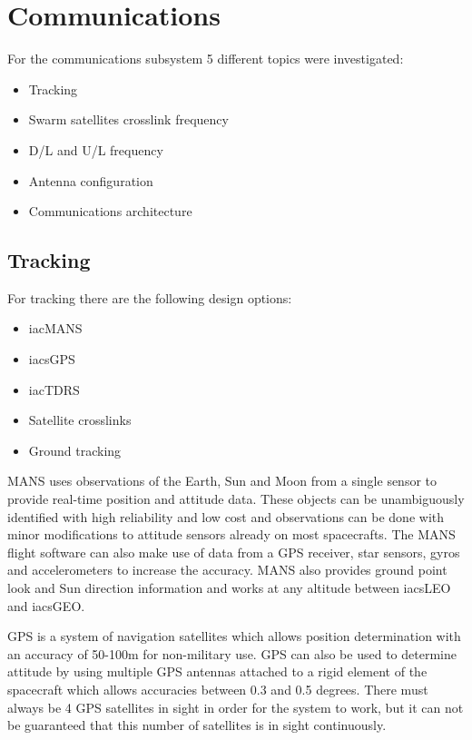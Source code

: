 \section{Communications}
\label{blDOCOM}

For the communications subsystem 5 different topics were investigated:
\begin{itemize}
\item Tracking
\item Swarm satellites crosslink frequency
\item D/L and U/L frequency
\item Antenna configuration
\item Communications architecture
\end{itemize}

\subsection{Tracking}
For tracking there are the following design options:
\begin {itemize}
\item iac{MANS}
\item iacs{GPS}
\item iac{TDRS}
\item Satellite crosslinks
\item Ground tracking
\end {itemize}

MANS uses observations of the Earth, Sun and Moon from a single sensor to provide real-time position and attitude data. These objects can be unambiguously identified with high reliability and low cost and observations can be done with minor modifications to attitude sensors already on most spacecrafts. The MANS flight software can also make use of data from a GPS receiver, star sensors, gyros and accelerometers to increase the accuracy. MANS also provides ground point look and Sun direction information and works at any altitude between iacs{LEO} and iacs{GEO}.

GPS is a system of navigation satellites which allows position determination with an accuracy of 50-100m for non-military use. GPS can also be used to determine attitude by using multiple GPS antennas attached to a rigid element of the spacecraft which allows accuracies between 0.3 and 0.5 degrees. There must always be 4 GPS satellites in sight in order for the system to work, but it can not be guaranteed that this number of satellites is in sight continuously.


